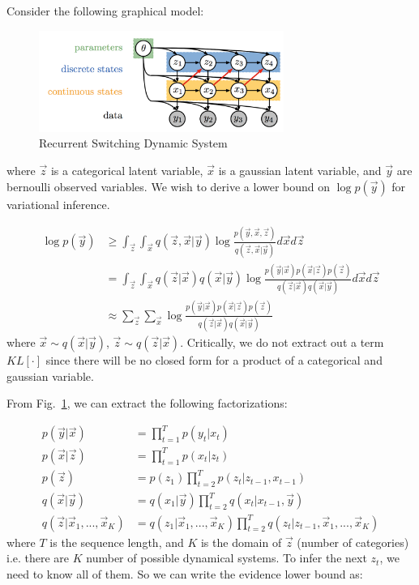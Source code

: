 \documentclass[12pt]{article}
\begin{document}
 
Consider the following graphical model: 

\begin{figure}[h]
\centering
\includegraphics[width=8cm]{graphical}
\caption{Recurrent Switching Dynamic System}
\label{mode}
\end{figure}

where $\vec{z}$ is a categorical latent variable, $\vec{x}$ is a gaussian latent variable, and $\vec{y}$ are bernoulli observed variables. We wish to derive a lower bound on $\log p(\vec{y})$ for variational inference.

\begin{align}
    \log p(\vec{y}) &\geq \int_{\vec{z}} \int_{\vec{x}} q(\vec{z},\vec{x}|\vec{y}) \log \frac{p(\vec{y},\vec{x},\vec{z})}{q(\vec{z},\vec{x}|\vec{y})} d\vec{x} d\vec{z} \\
                    &= \int_{\vec{z}} \int_{\vec{x}} q(\vec{z}|\vec{x})q(\vec{x}|\vec{y}) \log \frac{p(\vec{y}|\vec{x})p(\vec{x}|\vec{z})p(\vec{z})}{q(\vec{z}|\vec{x})q(\vec{x}|\vec{y})} d\vec{x} d\vec{z} \\
                    &\approx \sum_{\vec{z}} \sum_{\vec{x}} \log \frac{p(\vec{y}|\vec{x})p(\vec{x}|\vec{z})p(\vec{z})}{q(\vec{z}|\vec{x})q(\vec{x}|\vec{y})}
\end{align}
where $\vec{x} \sim q(\vec{x}|\vec{y})$, $\vec{z} \sim q(\vec{z}|\vec{x})$. Critically, we do not extract out a term $KL[\cdot]$ since there will be no closed form for a product of a categorical and gaussian variable. 

From Fig.~\ref{mode}, we can extract the following factorizations:

\begin{align}
    p(\vec{y}|\vec{x}) &= \prod_{t=1}^{T} p(y_t|x_t) \\
    p(\vec{x}|\vec{z}) &= \prod_{t=1}^{T} p(x_t|z_t) \\
    p(\vec{z}) &= p(z_1)\prod_{t=2}^{T} p(z_t|z_{t-1},x_{t-1}) \\
    q(\vec{x}|\vec{y}) &= q(x_1|\vec{y})\prod_{t=2}^{T} q(x_t|x_{t-1},\vec{y}) \\
    q(\vec{z}|\vec{x}_1, ..., \vec{x}_K) &= q(z_1|\vec{x}_1, ..., \vec{x}_K)\prod_{t=2}^{T} q(z_t|z_{t-1},\vec{x}_1, ..., \vec{x}_K)
\end{align}
where $T$ is the sequence length, and $K$ is the domain of $\vec{z}$ (number of categories) i.e. there are $K$ number of possible dynamical systems. To infer the next $z_t$, we need to know all of them. So we can write the evidence lower bound as:
\end{document}
